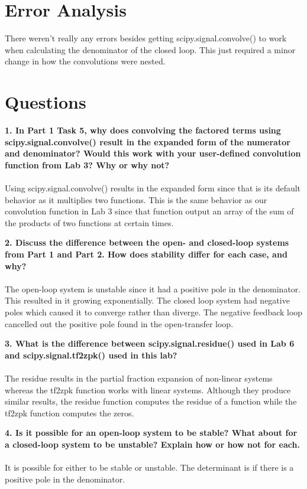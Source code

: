 \documentclass[12pt]{report}
\begin{document}
\pagebreak
\section{Error Analysis}
There weren't really any errors besides getting scipy.signal.convolve() to work when calculating the denominator of the closed loop. This just required a minor change in how the convolutions were nested.
\section{Questions}
\textbf{1. In Part 1 Task 5, why does convolving the factored terms using scipy.signal.convolve()
result in the expanded form of the numerator and denominator? Would this work with your
user-defined convolution function from Lab 3? Why or why not?} \\ \\
Using scipy.signal.convolve() results in the expanded form since that is its default behavior as it multiplies two functions. This is the same behavior as our convolution function in Lab 3 since that function output an array of the sum of the products of two functions at certain times.

\textbf{2. Discuss the difference between the open- and closed-loop systems from Part 1 and Part 2.
How does stability differ for each case, and why?} \\ \\
The open-loop system is unstable since it had a positive pole in the denominator. This resulted in it growing exponentially. The closed loop system had negative poles which caused it to converge rather than diverge. The negative feedback loop cancelled out the positive pole found in the open-transfer loop.

\textbf{3. What is the difference between scipy.signal.residue() used in Lab 6 and
scipy.signal.tf2zpk() used in this lab?} \\ \\
The residue results in the partial fraction expansion of non-linear systems whereas the tf2zpk function works with linear systems. Although they produce similar results, the residue function computes the residue of a function while the tf2zpk function computes the zeros.

\textbf{4. Is it possible for an open-loop system to be stable? What about for a closed-loop system to
be unstable? Explain how or how not for each.} \\ \\
It is possible for either to be stable or unstable. The determinant is if there is a positive pole in the denominator.
\end{document}
